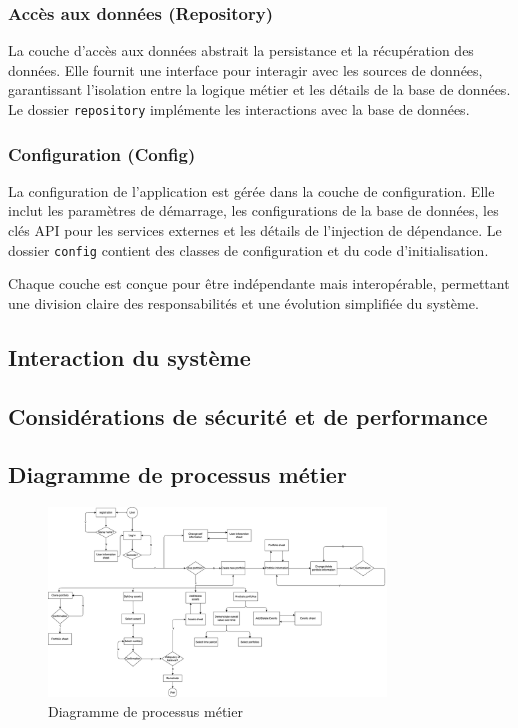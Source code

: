\documentclass{article}
\begin{document}
\subsubsection{Accès aux données (Repository)}
La couche d'accès aux données abstrait la persistance et la récupération des données. Elle fournit une interface pour interagir avec les sources de données, garantissant l'isolation entre la logique métier et les détails de la base de données. Le dossier \texttt{repository} implémente les interactions avec la base de données.

\subsubsection{Configuration (Config)}
La configuration de l'application est gérée dans la couche de configuration. Elle inclut les paramètres de démarrage, les configurations de la base de données, les clés API pour les services externes et les détails de l'injection de dépendance. Le dossier \texttt{config} contient des classes de configuration et du code d'initialisation.

Chaque couche est conçue pour être indépendante mais interopérable, permettant une division claire des responsabilités et une évolution simplifiée du système.
\subsection{Interaction du système}



\subsection{Considérations de sécurité et de performance}



\subsection{Diagramme de processus métier}
\begin{figure}[h]
    \centering
    \includegraphics[width=0.8\textwidth]{../analysises/bussness process/V1.0/analysisV1.0.png}
    \caption{Diagramme de processus métier}
    \label{fig:processusMetier}
\end{figure}
\newpage
\end{document}
